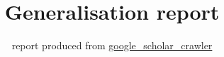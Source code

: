 \documentclass[]{article}
\title{Generalisation report}
\author{%
	report produced from \href{https://github.com/bethgelab/google_scholar_crawler}{google\_scholar\_crawler}\\
}
\begin{document}
\newcommand{\figwidth}{0.24\textwidth}
\newcommand{\captionspace}{-1.5\baselineskip}
\newcommand{\captionspaceII}{0.6\baselineskip}
\newcommand{\captionspaceBenchmark}{-0.5\baselineskip}


\maketitle



%
\end{document}
